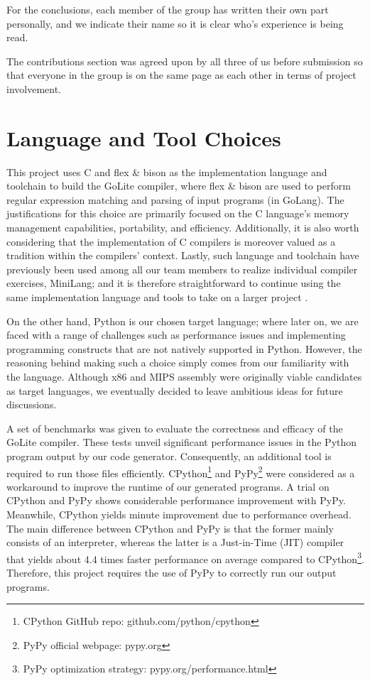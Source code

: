 \documentclass{article}
\begin{document}
For the conclusions, each member of the group has written their own part personally, and we indicate their name so it is clear who's experience is being read.

The contributions section was agreed upon by all three of us before submission so that everyone in the group is on the same page as each other in terms of project involvement.


\section{Language and Tool Choices}
This project uses C and flex \& bison as the implementation language and toolchain to build the GoLite compiler, where flex \& bison are used to perform regular expression matching and parsing of input programs (in GoLang). The justifications for this choice are primarily focused on the C language’s memory management capabilities, portability, and efficiency. Additionally, it is also worth considering that the implementation of C compilers is moreover valued as a tradition within the compilers’ context. Lastly, such language and toolchain have previously been used among all our team members to realize individual compiler exercises, MiniLang; and it is therefore straightforward to continue using the same implementation language and tools to take on a larger project \citep{ass1, ass2}.

On the other hand, Python is our chosen target language; where later on, we are faced with a range of challenges such as performance issues and implementing programming constructs that are not natively supported in Python. However, the reasoning behind making such a choice simply comes from our familiarity with the language. Although x86 and MIPS assembly were originally viable candidates as target languages, we eventually decided to leave ambitious ideas for future discussions.

A set of benchmarks was given to evaluate the correctness and efficacy of the GoLite compiler. These tests unveil significant performance issues in the Python program output by our code generator. Consequently, an additional tool is required to run those files efficiently. CPython\footnote{CPython GitHub repo: github.com/python/cpython} and PyPy\footnote{PyPy official webpage: pypy.org} were considered as a workaround to improve the runtime of our generated programs. A trial on CPython and PyPy shows considerable performance improvement with PyPy. Meanwhile, CPython yields minute improvement due to performance overhead. The main difference between CPython and PyPy is that the former mainly consists of an interpreter, whereas the latter is a Just-in-Time (JIT) compiler that yields about 4.4 times faster performance on average compared to CPython\footnote{PyPy optimization strategy: pypy.org/performance.html}. Therefore, this project requires the use of PyPy to correctly run our output programs.
\end{document}
